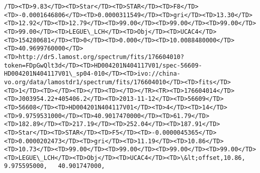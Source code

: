 \documentclass[11pt]{article}
\begin{document}
\begin{Verbatim}[commandchars=\\\{\}]
/TD><TD>9.83</TD><TD>Star</TD><TD>STAR</TD><TD>F8</TD><TD>-0.0001646806</TD><TD>0.0000311549</TD><TD>gri</TD><TD>13.30</TD><TD>12.92</TD><TD>12.79</TD><TD>99.00</TD><TD>99.00</TD><TD>99.00</TD><TD>99.00</TD><TD>LEGUE\_LCH</TD><TD>Obj</TD><TD>UCAC4</TD><TD>154280681</TD><TD>0</TD><TD>0.000</TD><TD>10.0088480000</TD><TD>40.9699760000</TD><TD>http://dr5.lamost.org/spectrum/fits/176604010?token=FDpGwQlt3d</TD><TD>HD004201N404117V01/spec-56609-HD004201N404117V01\_sp04-010</TD><TD>ivo://china-vo.org/data/lamostdr1/spectrum/fits/176604010</TD><TD>fits</TD><TD>1</TD><TD></TD><TD></TD><TD></TD></TR><TR><TD>176604014</TD><TD>J003954.22+405406.2</TD><TD>2013-11-12</TD><TD>56609</TD><TD>56608</TD><TD>HD004201N404117V01</TD><TD>4</TD><TD>14</TD><TD>9.9759531000</TD><TD>40.9017470000</TD><TD>61.79</TD><TD>182.89</TD><TD>217.19</TD><TD>252.04</TD><TD>187.91</TD><TD>Star</TD><TD>STAR</TD><TD>F5</TD><TD>-0.0000045365</TD><TD>0.0000202473</TD><TD>gri</TD><TD>11.19</TD><TD>10.86</TD><TD>10.73</TD><TD>99.00</TD><TD>99.00</TD><TD>99.00</TD><TD>99.00</TD><TD>LEGUE\_LCH</TD><TD>Obj</TD><TD>UCAC4</TD><TD>\&lt;offset,10.86,    9.975595000,   40.901747000, 
\end{Verbatim}
\end{document}

